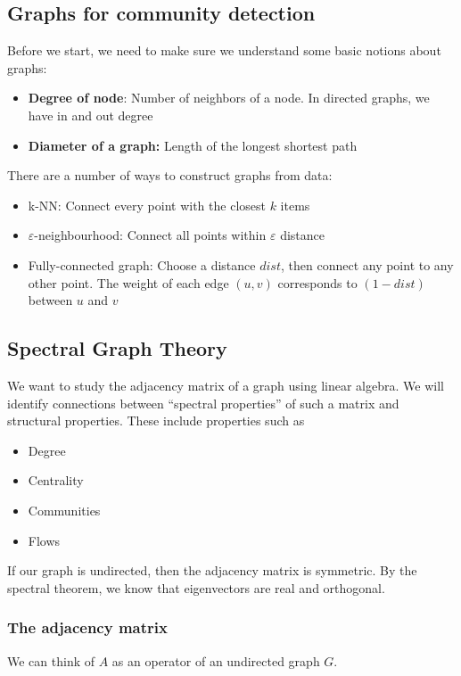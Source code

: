 \subsection{Graphs for community detection}

Before we start, we need to make sure we understand some basic notions about graphs:

\begin{itemize}
    \item \textbf{Degree of node}: Number of neighbors of a node. In directed graphs, we have in and out degree
    \item \textbf{Diameter of a graph:} Length of the longest shortest path
\end{itemize}

There are a number of ways to construct graphs from data:

\begin{itemize}
    \item k-NN: Connect every point with the closest $k$ items
    \item $\varepsilon$-neighbourhood: Connect all points within $\varepsilon$ distance
    \item Fully-connected graph: Choose a distance $dist$, then connect any point to any other point. The weight of each edge $(u, v)$ corresponds to $(1 - dist)$ between $u$ and $v$
\end{itemize}

\subsection{Spectral Graph Theory}
    We want to study the adjacency matrix of a graph using linear algebra. We will identify connections between ``spectral properties'' of such a matrix and structural properties. These include properties such as 
    \begin{itemize}
        \item Degree
        \item Centrality
        \item Communities
        \item Flows
    \end{itemize}

If our graph is undirected, then the adjacency matrix is symmetric. By the spectral theorem, we know that eigenvectors are real and orthogonal.

\subsubsection{The adjacency matrix}
    We can think of $A$ as an operator of an undirected graph $G$. 
    
